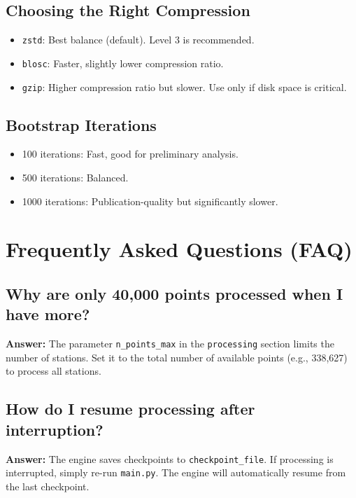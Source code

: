 \documentclass[12pt,a4paper]{article}
\begin{document}
\subsection{Choosing the Right Compression}
\begin{itemize}
    \item \texttt{zstd}: Best balance (default). Level 3 is recommended.
    \item \texttt{blosc}: Faster, slightly lower compression ratio.
    \item \texttt{gzip}: Higher compression ratio but slower. Use only if disk space is critical.
\end{itemize}

\subsection{Bootstrap Iterations}
\begin{itemize}
    \item 100 iterations: Fast, good for preliminary analysis.
    \item 500 iterations: Balanced.
    \item 1000 iterations: Publication-quality but significantly slower.
\end{itemize}

\section{Frequently Asked Questions (FAQ)}

\subsection{Why are only 40,000 points processed when I have more?}
\textbf{Answer:} The parameter \texttt{n\_points\_max} in the \texttt{processing} section limits the number of stations. Set it to the total number of available points (e.g., 338,627) to process all stations.

\subsection{How do I resume processing after interruption?}
\textbf{Answer:} The engine saves checkpoints to \texttt{checkpoint\_file}. If processing is interrupted, simply re-run \texttt{main.py}. The engine will automatically resume from the last checkpoint.
\end{document}
